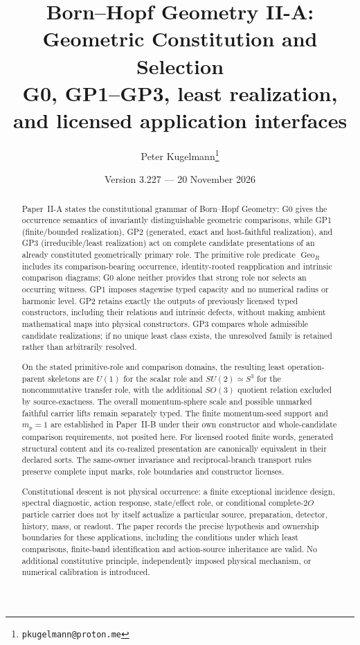 \documentclass[12pt,a4paper]{article}
\title{\textbf{Born--Hopf Geometry II-A: Geometric Constitution and Selection}\\[0.5em]
\large G0, GP1--GP3, least realization, and licensed application interfaces}
\author{Peter Kugelmann\thanks{\texttt{pkugelmann@proton.me}}}
\date{Version 3.227 --- 20 November 2026}
\begin{document}
\maketitle

\begin{abstract}
Paper~II-A states the constitutional grammar of Born--Hopf Geometry:
G0 gives the occurrence semantics of invariantly distinguishable geometric
comparisons, while GP1 (finite/bounded realization), GP2 (generated,
exact and host-faithful realization), and GP3 (irreducible/least
realization) act on complete candidate presentations of an already constituted
geometrically primary role.  The primitive role predicate
$\operatorname{Geo}_R$ includes its comparison-bearing occurrence,
identity-rooted reapplication and intrinsic comparison diagrams;
G0 alone neither provides that strong role nor selects an occurring witness.
GP1 imposes stagewise typed capacity and no numerical radius or harmonic level.
GP2 retains exactly the outputs of previously licensed typed constructors,
including their relations and intrinsic defects, without making ambient
mathematical maps into physical constructors. GP3 compares whole admissible
candidate realizations; if no unique least class exists, the unresolved
family is retained rather than arbitrarily resolved.

On the stated primitive-role and comparison domains, the resulting least
operation-parent skeletons are $U(1)$ for the scalar role and
$SU(2)\simeq S^3$ for the noncommutative transfer role, with the
additional $SO(3)$ quotient relation excluded by source-exactness.
The overall momentum-sphere scale and possible unmarked faithful carrier
lifts remain separately typed. The finite momentum-seed support and
$m_p=1$ are established in Paper~II-B under their own constructor and
whole-candidate comparison requirements, not posited here.
For licensed rooted finite words, generated structural content and its
co-realized presentation are canonically equivalent in their declared
sorts.  The same-owner invariance and reciprocal-branch transport rules
preserve complete input marks, role boundaries and constructor licenses.

Constitutional descent is not physical occurrence: a finite exceptional
incidence design, spectral diagnostic, action response, state/effect role,
or conditional complete-$2O$ particle carrier does not by itself
actualize a particular source, preparation, detector, history, mass, or
readout.  The paper records the precise hypothesis and ownership
boundaries for these applications, including the conditions under which
least comparisons, finite-band identification and action-source
inheritance are valid.  No additional constitutive principle,
independently imposed physical mechanism, or numerical calibration is
introduced.
\end{abstract}
\end{document}
